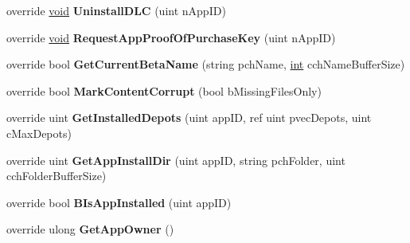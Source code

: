 \begin{DoxyCompactItemize}
\item 
\hypertarget{classValve_1_1Steamworks_1_1CSteamApps_a14885a36c953bdfa6f941e2dee7131bb}{}override \hyperlink{SDL__audio_8h_a52835ae37c4bb905b903cbaf5d04b05f}{void} {\bfseries Uninstall\+D\+L\+C} (uint n\+App\+I\+D)\label{classValve_1_1Steamworks_1_1CSteamApps_a14885a36c953bdfa6f941e2dee7131bb}

\item 
\hypertarget{classValve_1_1Steamworks_1_1CSteamApps_ae3ce445d7f09201dd92ee5a3d785d027}{}override \hyperlink{SDL__audio_8h_a52835ae37c4bb905b903cbaf5d04b05f}{void} {\bfseries Request\+App\+Proof\+Of\+Purchase\+Key} (uint n\+App\+I\+D)\label{classValve_1_1Steamworks_1_1CSteamApps_ae3ce445d7f09201dd92ee5a3d785d027}

\item 
\hypertarget{classValve_1_1Steamworks_1_1CSteamApps_ab6540df09823d12db6a90112ff2cbdd1}{}override bool {\bfseries Get\+Current\+Beta\+Name} (string pch\+Name, \hyperlink{SDL__thread_8h_a6a64f9be4433e4de6e2f2f548cf3c08e}{int} cch\+Name\+Buffer\+Size)\label{classValve_1_1Steamworks_1_1CSteamApps_ab6540df09823d12db6a90112ff2cbdd1}

\item 
\hypertarget{classValve_1_1Steamworks_1_1CSteamApps_a7f977ce4ed3a668fda076c048c813652}{}override bool {\bfseries Mark\+Content\+Corrupt} (bool b\+Missing\+Files\+Only)\label{classValve_1_1Steamworks_1_1CSteamApps_a7f977ce4ed3a668fda076c048c813652}

\item 
\hypertarget{classValve_1_1Steamworks_1_1CSteamApps_ae286bbc6240dc02ea8e536a45ebff8bf}{}override uint {\bfseries Get\+Installed\+Depots} (uint app\+I\+D, ref uint pvec\+Depots, uint c\+Max\+Depots)\label{classValve_1_1Steamworks_1_1CSteamApps_ae286bbc6240dc02ea8e536a45ebff8bf}

\item 
\hypertarget{classValve_1_1Steamworks_1_1CSteamApps_ac84007dbbde7e0821b2f65ea3f7de784}{}override uint {\bfseries Get\+App\+Install\+Dir} (uint app\+I\+D, string pch\+Folder, uint cch\+Folder\+Buffer\+Size)\label{classValve_1_1Steamworks_1_1CSteamApps_ac84007dbbde7e0821b2f65ea3f7de784}

\item 
\hypertarget{classValve_1_1Steamworks_1_1CSteamApps_a4238803bc3b9ada9c0a0ca0b2898135e}{}override bool {\bfseries B\+Is\+App\+Installed} (uint app\+I\+D)\label{classValve_1_1Steamworks_1_1CSteamApps_a4238803bc3b9ada9c0a0ca0b2898135e}

\item 
\hypertarget{classValve_1_1Steamworks_1_1CSteamApps_abc5a1926698fb6b7fa8cc3eee8e5fc81}{}override ulong {\bfseries Get\+App\+Owner} ()\label{classValve_1_1Steamworks_1_1CSteamApps_abc5a1926698fb6b7fa8cc3eee8e5fc81}


\end{DoxyCompactItemize}
